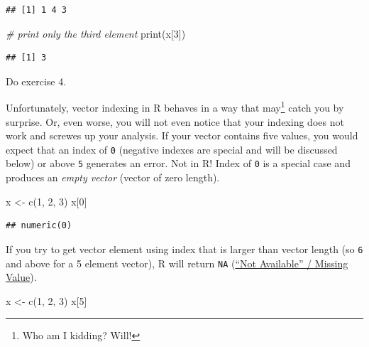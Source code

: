 \documentclass[
]{book}
\newenvironment{Shaded}{\begin{snugshade}}{\end{snugshade}}
\newcommand{\CommentTok}[1]{\textcolor[rgb]{0.56,0.35,0.01}{\textit{#1}}}
\newcommand{\DecValTok}[1]{\textcolor[rgb]{0.00,0.00,0.81}{#1}}
\newcommand{\FunctionTok}[1]{\textcolor[rgb]{0.00,0.00,0.00}{#1}}
\newcommand{\NormalTok}[1]{#1}
\newcommand{\OtherTok}[1]{\textcolor[rgb]{0.56,0.35,0.01}{#1}}
\begin{document}
\begin{verbatim}
## [1] 1 4 3
\end{verbatim}

\begin{Shaded}
\begin{Highlighting}[]
\CommentTok{\# print only the third element}
\FunctionTok{print}\NormalTok{(x[}\DecValTok{3}\NormalTok{])}
\end{Highlighting}
\end{Shaded}

\begin{verbatim}
## [1] 3
\end{verbatim}

Do exercise 4.

Unfortunately, vector indexing in R behaves in a way that may\footnote{Who am I kidding? Will!} catch you by surprise. Or, even worse, you will not even notice that your indexing does not work and screwes up your analysis. If your vector contains five values, you would expect that an index of \texttt{0} (negative indexes are special and will be discussed below) or above \texttt{5} generates an error. Not in R! Index of \texttt{0} is a special case and produces an \emph{empty vector} (vector of zero length).

\begin{Shaded}
\begin{Highlighting}[]
\NormalTok{x }\OtherTok{\textless{}{-}} \FunctionTok{c}\NormalTok{(}\DecValTok{1}\NormalTok{, }\DecValTok{2}\NormalTok{, }\DecValTok{3}\NormalTok{)}
\NormalTok{x[}\DecValTok{0}\NormalTok{]}
\end{Highlighting}
\end{Shaded}

\begin{verbatim}
## numeric(0)
\end{verbatim}

If you try to get vector element using index that is larger than vector length (so \texttt{6} and above for a 5 element vector), R will return \texttt{NA} (\href{https://stat.ethz.ch/R-manual/R-devel/library/base/html/NA.html}{``Not Available'' / Missing Value}).

\begin{Shaded}
\begin{Highlighting}[]
\NormalTok{x }\OtherTok{\textless{}{-}} \FunctionTok{c}\NormalTok{(}\DecValTok{1}\NormalTok{, }\DecValTok{2}\NormalTok{, }\DecValTok{3}\NormalTok{)}
\NormalTok{x[}\DecValTok{5}\NormalTok{]}
\end{Highlighting}
\end{Shaded}
\end{document}
